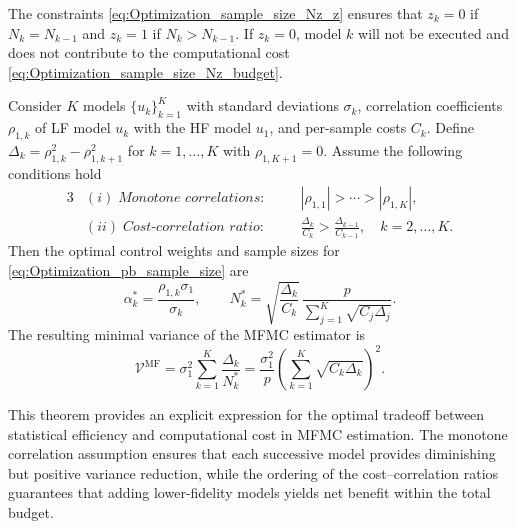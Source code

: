 The constraints \eqref{eq:Optimization_sample_size_Nz_z} ensures that $z_k = 0$ if $N_k = N_{k-1}$ and 
$z_k = 1$ if $N_k >  N_{k-1}$. If $z_k = 0$, model $k$ will not be executed and does not contribute to the 
computational cost \eqref{eq:Optimization_sample_size_Nz_budget}.

%
\begin{theorem}
\label{thm:Sample_size_est}
Consider $K$ models $\{u_{k}\}_{k=1}^K$ with standard deviations $\sigma_k$, correlation coefficients $\rho_{1,k}$ of LF model $u_k$ with the HF model $u_1$, and per-sample costs $C_k$. Define $\Delta_k = \rho_{1,k}^2 - \rho_{1,k+1}^2$ for $k = 1, \dots, K$ with $\rho_{1,K+1}=0$. Assume the following conditions hold
%
\begin{alignat*}{3}
&(i)\;\textit{Monotone correlations:} &\quad& |\rho_{1,1}| > \cdots > |\rho_{1,K}|,\\
&(ii)\;\textit{Cost-correlation ratio:} &\quad& \frac{\Delta_{k}}{C_k} > \frac{\Delta_{k-1}}{C_{k-1}}, \quad k=2,\ldots,K.
\end{alignat*}
%
Then the optimal control weights and sample sizes for \eqref{eq:Optimization_pb_sample_size} are
%
\begin{equation}\label{eq:MFMC_RealValued_Sample_Size}
    \alpha_k^* = \frac{\rho_{1,k}\sigma_1}{\sigma_k}, \qquad
    N_k^* = \sqrt{\frac{\Delta_k}{C_k}}\,
    \frac{p}{\sum_{j=1}^K \sqrt{C_j \Delta_j}}.
\end{equation}
%
%
The resulting minimal variance of the MFMC estimator is
\begin{equation}\label{eq:MFMC_variance_optimal}
\mathcal{V}^{\text{MF}}
= \sigma_1^2\sum_{k=1}^K \frac{\Delta_k}{N_k^*}=\frac{\sigma_1^2}{p}\!\left(\sum_{k=1}^K \sqrt{C_k \Delta_k}\right)^{\!2}.
\end{equation}
\end{theorem}
%
This theorem provides an explicit expression for the optimal tradeoff between statistical efficiency and computational cost in MFMC estimation. The monotone correlation assumption ensures that each successive model provides diminishing but positive variance reduction, while the ordering of the cost–correlation ratios guarantees that adding lower-fidelity models yields net benefit within the total budget. 


